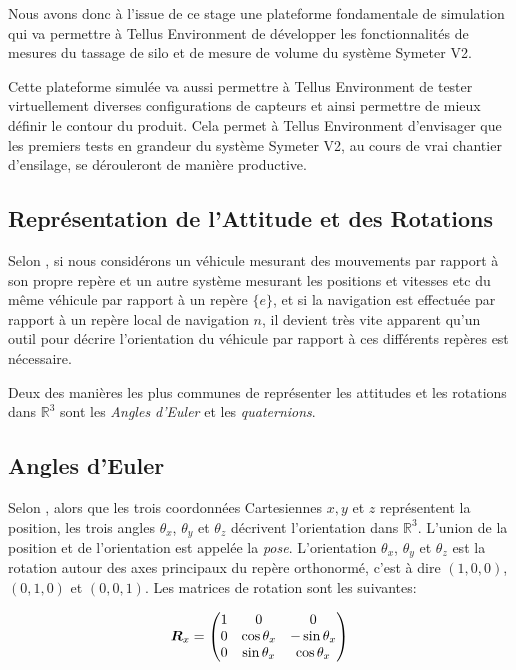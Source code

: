 \documentclass[12pt,a4paper]{report}
\begin{document}
\para Nous avons donc à l'issue de ce stage une plateforme fondamentale de simulation qui va permettre à Tellus Environment de développer les fonctionnalités de mesures du tassage de silo et de mesure de volume du système Symeter V2. 

\para Cette plateforme simulée va aussi permettre à Tellus Environment de tester virtuellement diverses configurations de capteurs et ainsi permettre de mieux définir le contour du produit. Cela permet à Tellus Environment d'envisager que les premiers tests en grandeur du système Symeter V2, au cours de vrai chantier d'ensilage, se dérouleront de manière productive.



\begin{appendix}
	\chapter{Représentation de l'Attitude et des Rotations}
	Selon \cite{gustavsson_uav_2015}, si nous considérons un véhicule mesurant des mouvements par rapport à son propre repère et un autre système mesurant les positions et vitesses etc du même véhicule par rapport à un repère $\{e\}$, et si la navigation est effectuée par rapport à un repère local de navigation ${n}$, il devient très vite apparent qu'un outil pour décrire l'orientation du véhicule par rapport à ces différents repères est nécessaire.
	
	\para Deux des manières les plus communes de représenter les attitudes et les rotations dans $\mathbb{R}^3$ sont les \textit{Angles d'Euler} et les \textit{quaternions}.
		\section{Angles d'Euler}
		Selon \cite{nuchter_3d_2009}, alors que les trois coordonnées Cartesiennes $x,y$ et $z$ représentent la position, les trois angles $\theta_x$, $\theta_y$ et $\theta_z$ décrivent l'orientation dans $\mathbb{R}^3$. L'union de la position et de l'orientation est appelée la \textit{pose}. L'orientation $\theta_x$, $\theta_y$ et $\theta_z$ est la rotation autour des axes principaux du repère orthonormé, c'est à dire $(1,0,0)$, $(0,1,0)$ et $(0,0,1)$. Les matrices de rotation sont les suivantes:
		
		\begin{equation*}
		\boldsymbol{R}_x =	\begin{pmatrix}
		1 & 0 & 0 \\
		0 & \cos{\theta_x} & -\sin{\theta_x}\\
		0 & \sin{\theta_x} & \cos{\theta_x}
		

\end{pmatrix}
\end{equation*}
\end{appendix}
\end{document}
